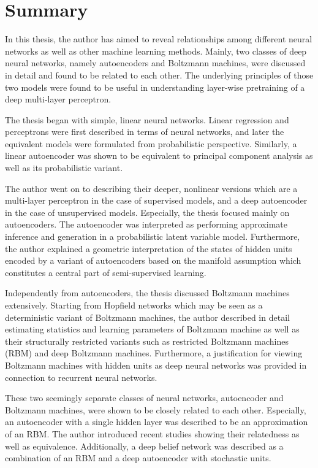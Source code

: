 \documentclass[dissertation,nocontribution,draft*]{aaltoseries}
\begin{document}
\section{Summary}

In this thesis, the author has aimed to reveal relationships
among different neural networks as well as other
machine learning methods. Mainly, two classes of deep neural
networks, namely autoencoders and Boltzmann machines, were
discussed in detail and found to be related to each other.
The underlying principles of those two models were found to
be useful in understanding layer-wise pretraining of a deep
multi-layer perceptron.

The thesis began with simple, linear neural networks.
Linear regression and perceptrons were first described in
terms of neural networks, and later the equivalent models
were formulated from probabilistic perspective. Similarly, a
linear autoencoder was shown to be equivalent to principal
component analysis as well as its probabilistic variant.

The author went on to describing their deeper, nonlinear
versions which are a multi-layer perceptron in the case of
supervised models, and a deep autoencoder in the case of
unsupervised models. Especially, the thesis focused mainly
on autoencoders. The autoencoder was interpreted as
performing approximate inference and generation in a
probabilistic latent variable model.  Furthermore, the
author explained a geometric interpretation of the states of
hidden units encoded by a variant of autoencoders based on
the manifold assumption which constitutes a central part of
semi-supervised learning.

Independently from autoencoders, the thesis discussed
Boltzmann machines extensively. Starting from Hopfield networks
which may be seen as a deterministic variant of Boltzmann
machines, the author described in detail estimating
statistics and learning parameters of Boltzmann machine as
well as their structurally restricted variants such as
restricted Boltzmann machines (RBM) and deep Boltzmann
machines. Furthermore, a justification for viewing Boltzmann
machines with hidden units as deep neural networks was
provided in connection to recurrent neural networks.

These two seemingly separate classes of neural networks,
autoencoder and Boltzmann machines, were shown to be closely
related to each other. Especially, an autoencoder with a
single hidden layer was described to be an approximation of
an RBM. The author introduced recent studies showing their
relatedness as well as equivalence. Additionally, a deep
belief network was described as a combination of an RBM and
a deep autoencoder with stochastic units.
\end{document}
